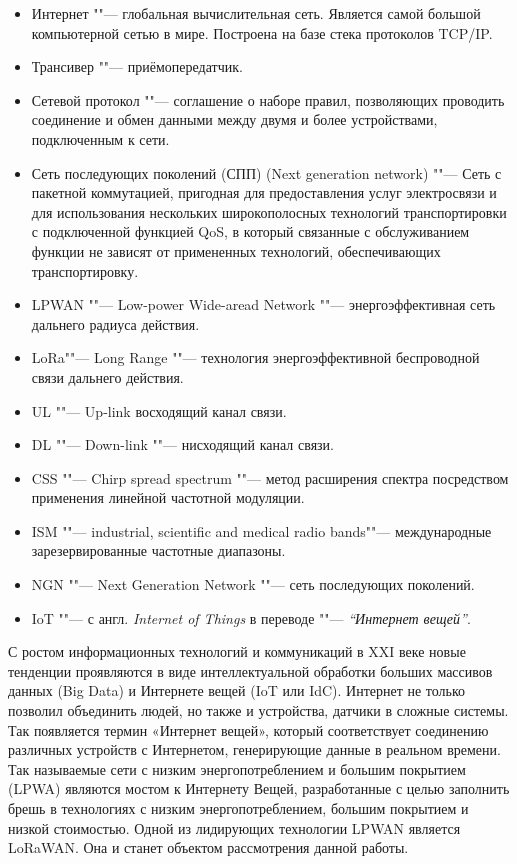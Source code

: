 \Defines

\begin{itemize}
 \item[] Интернет ""--- глобальная вычислительная сеть. Является самой 
большой компьютерной сетью в мире. Построена на базе стека протоколов TCP/IP.
 \item[] Трансивер ""--- приёмопередатчик.
 \item[] Сетевой протокол ""--- соглашение о наборе правил, позволяющих 
проводить соединение и обмен данными между двумя и более устройствами, 
подключенным к сети.
 \item[] Сеть последующих поколений (СПП) (Next generation network) ""--- Сеть 
с пакетной коммутацией, пригодная для предоставления услуг электросвязи и для 
использования нескольких широкополосных технологий транспортировки с 
подключенной функцией QoS, в который связанные с обслуживанием функции не 
зависят от примененных технологий, обеспечивающих транспортировку.
\end{itemize}

\Abbreviations
\begin{itemize}
  \item[] LPWAN ""--- Low-power Wide-aread Network ""--- энергоэффективная сеть 
дальнего радиуса действия.
  \item[] LoRa\texttrademark ""--- Long Range ""--- технология энергоэффективной 
беспроводной 
связи дальнего действия.
  \item[] UL ""--- Up-link восходящий канал связи.
  \item[] DL ""--- Down-link ""--- нисходящий канал связи.
  \item[] CSS ""--- Chirp spread spectrum ""--- метод расширения спектра посредством применения линейной частотной модуляции.
  \item[] ISM ""--- industrial, scientific and medical radio bands""--- 
международные зарезервированные частотные диапазоны.
  \item[] NGN ""--- Next Generation Network ""--- сеть последующих поколений.
  \item[] IoT ""--- с англ. \textit{Internet of Things} в переводе ""--- 
\textit{``Интернет вещей''}.
\end{itemize}

\Introduction
С ростом информационных технологий и коммуникаций в XXI веке новые тенденции 
проявляются в виде интеллектуальной обработки больших массивов данных (Big Data) 
и Интернете вещей (IoT или IdC). 
Интернет не только позволил объединить людей, но также и устройства, датчики в 
сложные системы. 
Так появляется термин «Интернет вещей», который соответствует соединению 
различных устройств с Интернетом, генерирующие данные в реальном времени. 
Так называемые сети с низким энергопотреблением и большим покрытием (LPWA) 
являются мостом к Интернету Вещей, разработанные с целью заполнить брешь в 
технологиях с низким энергопотреблением, большим покрытием и низкой стоимостью. 
Одной из лидирующих технологии LPWAN является LoRaWAN\texttrademark. Она и 
станет объектом рассмотрения данной работы.

